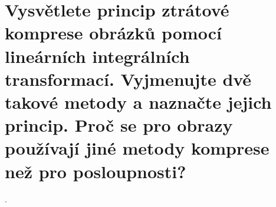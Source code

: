 \section{Vysvětlete princip ztrátové komprese obrázků pomocí lineárních integrálních transformací. Vyjmenujte dvě takové 
metody a naznačte jejich princip. Proč se pro obrazy používají jiné metody komprese než pro posloupnosti?}.